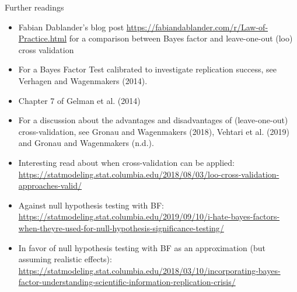 \documentclass[12pt,ignorenonframetext,aspectratio=169]{beamer}
\providecommand{\tightlist}{%
  \setlength{\itemsep}{0pt}\setlength{\parskip}{0pt}}
\begin{document}
\begin{frame}{Further readings}
\protect\hypertarget{further-readings}{}

\small

\begin{itemize}
\tightlist
\item
  Fabian Dablander's blog post \url{https://fabiandablander.com/r/Law-of-Practice.html} for a comparison between Bayes factor and leave-one-out (loo) cross validation
\item
  For a Bayes Factor Test calibrated to investigate replication success, see Verhagen and Wagenmakers (2014).
\item
  Chapter 7 of Gelman et al. (2014)
\item
  For a discussion about the advantages and disadvantages of (leave-one-out) cross-validation, see Gronau and Wagenmakers (2018), Vehtari et al. (2019) and Gronau and Wagenmakers (n.d.).
\end{itemize}

\end{frame}

\begin{frame}

\begin{itemize}
\tightlist
\item
  Interesting read about when cross-validation can be applied: \url{https://statmodeling.stat.columbia.edu/2018/08/03/loo-cross-validation-approaches-valid/}
\item
  Against null hypothesis testing with BF: \url{https://statmodeling.stat.columbia.edu/2019/09/10/i-hate-bayes-factors-when-theyre-used-for-null-hypothesis-significance-testing/}
\item
  In favor of null hypothesis testing with BF as an approximation (but assuming realistic effects): \url{https://statmodeling.stat.columbia.edu/2018/03/10/incorporating-bayes-factor-understanding-scientific-information-replication-crisis/}
\end{itemize}

\end{frame}
\end{document}
